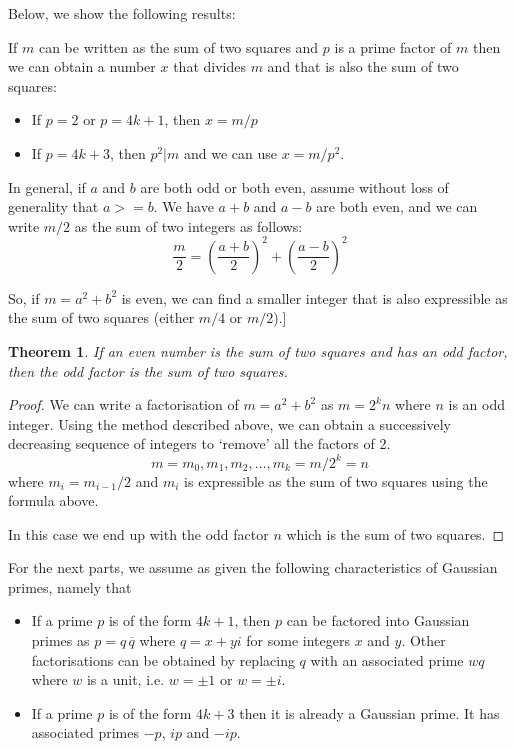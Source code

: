 \documentclass[11pt]{amsart}
\newtheorem{theorem}{Theorem}[section]
\begin{document}
\vspace{2em}

Below, we show the following results:



If $m$ can be written as the sum of two squares and $p$ is a prime factor of $m$ then we can obtain a number $x$ that divides $m$ and that is also the sum of two squares:
\begin{itemize}
\item
If $p=2$ or $p=4k+1$, then $x = m/p$
\item
If $p=4k+3$, then $p^2 | m$ and we can use $x= m/ p^2$.
\end{itemize}

\vspace{2em}



In general, if $a$ and $b$ are both odd or both even, assume without loss of generality that $a >= b$. We have $a+b$ and $a-b$ are both even, and we can write $m/2$ as the sum of two integers as follows:
$$
\frac{m}{2} = \left(\frac{a+b}{2}\right)^2 + \left(\frac{a-b}{2}\right)^2
$$


\vspace{1em}

So, if $m = a^2 + b^2$ is even, we can find a smaller integer that is also expressible as the sum of two squares (either $m/4$ or $m/2$).]



\begin{theorem}
If an even number is the sum of two squares and has an odd factor, then the odd factor is the sum of two squares.
\end{theorem}

\begin{proof}
We can write a factorisation of $m = a^2 + b^2$ as $m = 2^k n$ where $n$ is an odd integer.
Using the method described above, we can obtain a successively decreasing sequence of integers to `remove' all the factors of 2.
$$
m = m_0 , m_1, m_2, \ldots, m_k = m/2^{k} =  n
$$
where $m_i = m_{i-1}/2$ and $m_{i}$ is expressible as the sum of two squares using the formula above.


In this case we end up with the odd factor $n$ which is the sum of two squares.


\end{proof}

\vspace{1em}

For the next parts, we assume as given the following characteristics of Gaussian primes, namely that
\begin{itemize}
\item
If a prime $p$ is of the form $4k+1$, then $p$ can be factored into Gaussian primes as $p = q \, \overline{q}$  where $q = x + y i$ for some integers $x$ and $y$. Other factorisations can be obtained by replacing $q$ with an associated prime $w q$ where $w$ is a unit, i.e. $w = \pm 1$ or $w = \pm i$.
\item
If a prime $p$ is of the form $4 k + 3$ then it is already a Gaussian prime. It has associated primes $-p$, $ip$ and $-ip$.
\end{itemize}
\end{document}
